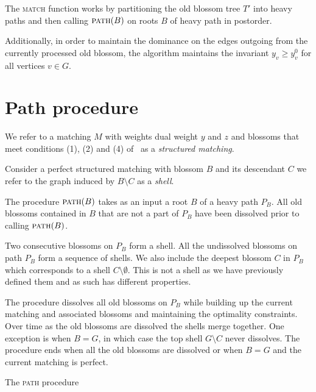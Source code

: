 The \textsc{match} function works by partitioning the old blossom tree $T'$ into heavy paths and then calling $\textsc{path}(B)$ on roots $B$ of heavy path in postorder.

Additionally, in order to maintain the dominance on the edges outgoing from the currently processed old blossom, the algorithm maintains the invariant $y_v \geq y^0_v$ for all vertices $v \in G$.

\section{Path procedure}

We refer to a matching $M$ with weights dual weight $y$ and $z$ and blossoms that meet conditions (1), (2) and (4) of~ as a \emph{structured matching}.

\begin{defn}[shell]
    Consider a perfect structured matching with blossom $B$ and its descendant $C$ we refer to the graph induced by $B \setminus C$ as a \emph{shell}.
\end{defn}

The procedure $\textsc{path}(B)$ takes as an input a root $B$ of a heavy path $P_B$. All old blossoms contained in $B$ that are not a part of $P_B$ have been dissolved prior to calling $\textsc{path}(B)$. 

Two consecutive blossoms on $P_B$ form a shell. All the undissolved blossoms on path $P_B$ form a sequence of shells. We also include the deepest blossom $C$ in $P_B$ which corresponds to a shell $C \setminus \emptyset$. This is not a shell as we have previously defined them and as such has different properties. 

The procedure dissolves all old blossoms on $P_B$ while building up the current matching and associated blossoms and maintaining the optimality constraints. Over time as the old blossoms are dissolved the shells merge together. One exception is when $B = G$, in which case the top shell $G \setminus C$ never dissolves. The procedure ends when all the old blossoms are dissolved or when $B = G$ and the current matching is perfect.

\begin{algorithm}
\caption{The \textsc{path} procedure}
\begin{algorithmic}[1]
        \EndIf
    \EndFor
\EndWhile
\EndProcedure
\end{algorithmic}
\end{algorithm}

